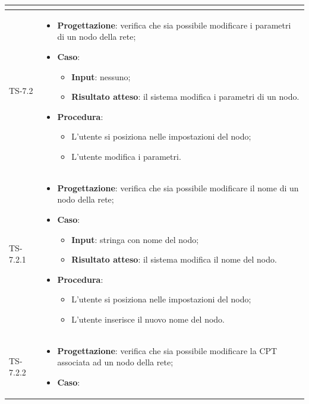 \begin{longtable}{|C{2.5cm}|C{13cm}|}
\begin{itemize}
\begin{itemize}
	\end{itemize} 
\end{itemize}
	  \\
	\hline
	{TS-7.2} &
\begin{itemize}
	\item \textbf{Progettazione}: verifica che sia possibile modificare i
	parametri di un nodo della rete;
	\item \textbf{Caso}: 
	\begin{itemize}
		\item \textbf{Input}: nessuno;
		\item \textbf{Risultato atteso}: il sistema modifica i parametri di un nodo.
	\end{itemize}
	\item \textbf{Procedura}:
	\begin{itemize}
		\item L'utente si posiziona nelle impostazioni del nodo;
		\item L'utente modifica i parametri.
	\end{itemize} 
\end{itemize}
	 \\
	\hline
	{TS-7.2.1} & 
\begin{itemize}
	\item \textbf{Progettazione}: verifica che sia  possibile modificare il
	nome di un nodo della rete;
	\item \textbf{Caso}: 
	\begin{itemize}
		\item \textbf{Input}: stringa con nome del nodo;
		\item \textbf{Risultato atteso}: il sistema modifica il nome del nodo.
	\end{itemize}
	\item \textbf{Procedura}:
	\begin{itemize}
		\item L'utente si posiziona nelle impostazioni del nodo;
		\item L'utente inserisce il nuovo nome del nodo.
	\end{itemize} 
\end{itemize}
	 \\
	\hline
	{TS-7.2.2} & 
\begin{itemize}
	\item \textbf{Progettazione}: verifica che sia possibile modificare la
	CPT associata ad un nodo della rete;
	\item \textbf{Caso}: 
	\begin{itemize}

\end{itemize}
\end{itemize}
\end{longtable}
